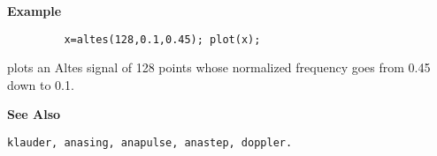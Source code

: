 {\bf \large \sf Example}\\
\hspace*{1.5cm}
\begin{minipage}[t]{13.5cm}
\begin{verbatim}
         x=altes(128,0.1,0.45); plot(x);
\end{verbatim}
plots an Altes signal of 128 points whose normalized frequency goes from
0.45 down to 0.1.
\end{minipage}
\vspace*{.5cm}


{\bf \large \sf See Also}\\
\hspace*{1.5cm}
\begin{minipage}[t]{13.5cm}
\begin{verbatim}
klauder, anasing, anapulse, anastep, doppler.
\end{verbatim}
\end{minipage}

